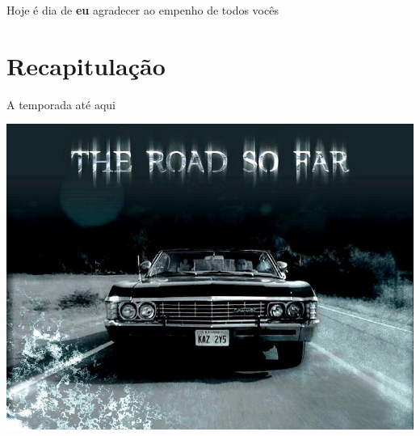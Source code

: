 \documentclass{beamer}
\begin{document}
\begin{frame}{\scriptsize }
  \begin{center}
    Hoje é dia de {\bf eu} agradecer ao empenho de todos vocês
  \end{center}
\end{frame}

\section{Recapitulação}

\begin{frame}{\scriptsize A temporada até aqui}
  \begin{center}
    \includegraphics[width=\textwidth]{Encerramento/theroadsofar}
  \end{center}
\end{frame}
\end{document}
